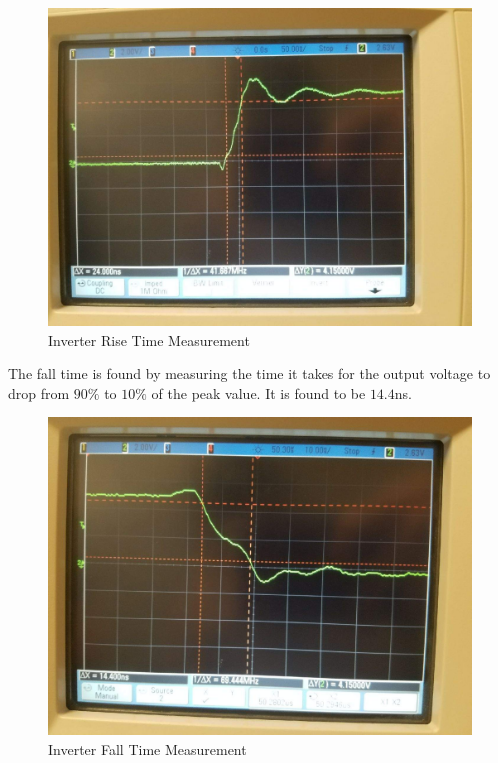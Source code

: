 \FloatBarrier
\begin{figure}[h!]
	\centering
	\includegraphics[scale=0.25]{./images/inverter_tr.jpeg}
	\caption{Inverter Rise Time Measurement}
	\label{fig:inverter_rise_time}
\end{figure}
\FloatBarrier

The fall time is found by measuring the time it takes for the output voltage to drop from $90\%$ to $10\%$ of the peak value. It is found to be $14.4$\si{\nano\second}.

\FloatBarrier
\begin{figure}[h!]
	\centering
	\includegraphics[scale=0.25]{./images/inverter_tf.jpeg}
	\caption{Inverter Fall Time Measurement}
	\label{fig:inverter_fall_time}
\end{figure}
\FloatBarrier

